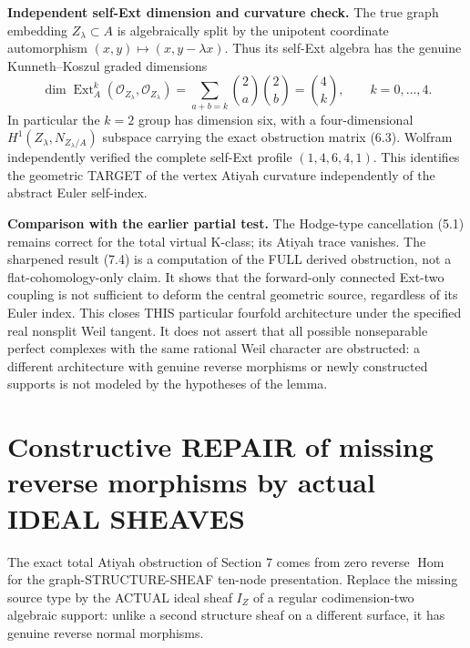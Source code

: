 \documentclass[11pt,a4paper]{article}
\begin{document}
\noindent\textbf{Independent self-Ext dimension and curvature check.}
The true graph embedding
\(Z_\lambda\subset A\)
is algebraically split
by the unipotent
coordinate automorphism
\((x,y)\mapsto(x,y-\lambda x)\).
Thus its self-Ext algebra
has the genuine
Kunneth--Koszul
graded dimensions
\[
  \dim\operatorname{Ext}^k_A
  (\mathcal O_{Z_\lambda},
   \mathcal O_{Z_\lambda})
   =\sum_{a+b=k}
       \binom2a\binom2b
   =\binom4k,\qquad k=0,\ldots,4.
\]
In particular the
\(k=2\) group has
dimension six, with a
four-dimensional
\(H^1(Z_\lambda,N_{Z_\lambda/A})\)
subspace carrying
the exact obstruction
matrix (6.3).
Wolfram independently
verified the complete
self-Ext profile
\( (1,4,6,4,1)\).
This identifies the
geometric TARGET of
the vertex Atiyah
curvature independently
of the abstract
Euler self-index.

\noindent\textbf{Comparison with the earlier partial test.}
The Hodge-type
cancellation (5.1)
remains correct for
the total virtual
K-class; its Atiyah
trace vanishes.
The sharpened result
(7.4) is a computation
of the FULL derived
obstruction, not a
flat-cohomology-only
claim. It shows that
the forward-only
connected Ext-two
coupling is not
sufficient to deform
the central geometric
source, regardless
of its Euler index.
This closes THIS
particular fourfold
architecture under the
specified real
nonsplit Weil tangent.
It does not assert that
all possible
nonseparable perfect
complexes with the
same rational Weil
character are
obstructed: a different
architecture with
genuine reverse
morphisms or newly
constructed supports
is not modeled by
the hypotheses of
the lemma.

\section{Constructive REPAIR of missing reverse morphisms by actual IDEAL SHEAVES}
The exact total Atiyah
obstruction of Section 7
comes from zero reverse
\(\operatorname{Hom}\) for
the graph-STRUCTURE-SHEAF
ten-node presentation.
Replace the missing source
type by the ACTUAL ideal
sheaf \(I_Z\) of a
regular codimension-two
algebraic support:
unlike a second
structure sheaf on a
different surface,
it has genuine reverse
normal morphisms.
\end{document}
